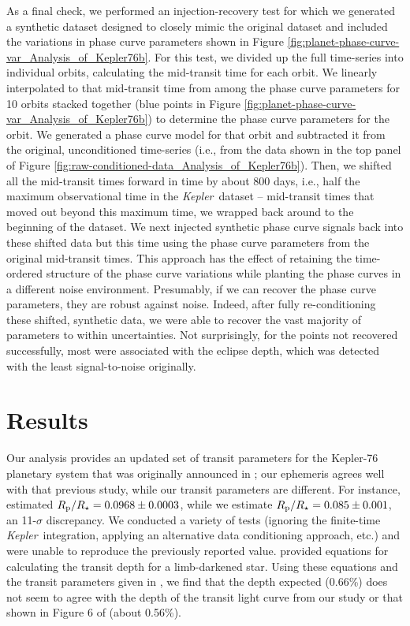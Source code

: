 \documentclass[manuscript]{aastex62}
\newcommand{\kepler}{{\it Kepler}}
\begin{document}
As a final check, we performed an injection-recovery test for which we generated a synthetic dataset designed to closely mimic the original dataset and included the variations in phase curve parameters shown in Figure \ref{fig:planet-phase-curve-var_Analysis_of_Kepler76b}. For this test, we divided up the full time-series into individual orbits, calculating the mid-transit time for each orbit. We linearly interpolated to that mid-transit time from among the phase curve parameters for 10 orbits stacked together (blue points in Figure \ref{fig:planet-phase-curve-var_Analysis_of_Kepler76b}) to determine the phase curve parameters for the orbit. We generated a phase curve model for that orbit and subtracted it from the original, unconditioned time-series (i.e., from the data shown in the top panel of Figure \ref{fig:raw-conditioned-data_Analysis_of_Kepler76b}). Then, we shifted all the mid-transit times forward in time by about 800 days, i.e., half the maximum observational time in the \kepler\ dataset -- mid-transit times that moved out beyond this maximum time, we wrapped back around to the beginning of the dataset. We next injected synthetic phase curve signals back into these shifted data but this time using the phase curve parameters from the original mid-transit times. This approach has the effect of retaining the time-ordered structure of the phase curve variations while planting the phase curves in a different noise environment. Presumably, if we can recover the phase curve parameters, they are robust against noise. Indeed, after fully re-conditioning these shifted, synthetic data, we were able to recover the vast majority of parameters to within uncertainties. Not surprisingly, for the points not recovered successfully, most were associated with the eclipse depth, which was detected with the least signal-to-noise originally.


\section{Results}
\label{sec:Results}
Our analysis provides an updated set of transit parameters for the Kepler-76 planetary system that was originally announced in \citet{2013ApJ...771...26F}; our ephemeris agrees well with that previous study, while our transit parameters are different. For instance, \citet{2013ApJ...771...26F} estimated $R_{\rm p}/R_\star = 0.0968 \pm 0.0003$, while we estimate $R_{\rm p}/R_\star = 0.085 \pm 0.001$, an 11-$\sigma$ discrepancy. We conducted a variety of tests (ignoring the finite-time \kepler\ integration, applying an alternative data conditioning approach, etc.) and were unable to reproduce the previously reported value. \citet{2019arXiv190101730H} provided equations for calculating the transit depth for a limb-darkened star. Using these equations and the transit parameters given in \citet{2013ApJ...771...26F}, we find that the depth expected (0.66\%) does not seem to agree with the depth of the transit light curve from our study or that shown in Figure 6 of \citet{2013ApJ...771...26F} (about 0.56\%).
\end{document}
